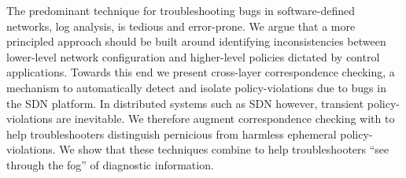 The predominant technique for troubleshooting bugs in software-defined networks,
log analysis, is tedious and error-prone. We argue that a more principled
approach should be built around identifying inconsistencies between lower-level
network configuration and higher-level policies dictated by control
applications. Towards this end we present
cross-layer correspondence checking, a mechanism to automatically detect and
isolate policy-violations due to bugs in the SDN platform. In
distributed systems such as SDN however,
transient policy-violations are inevitable.
We therefore augment correspondence checking with \simulator{} to help troubleshooters
distinguish pernicious from harmless ephemeral policy-violations. We
show that these techniques combine to help troubleshooters ``see through the fog'' of
diagnostic information.
